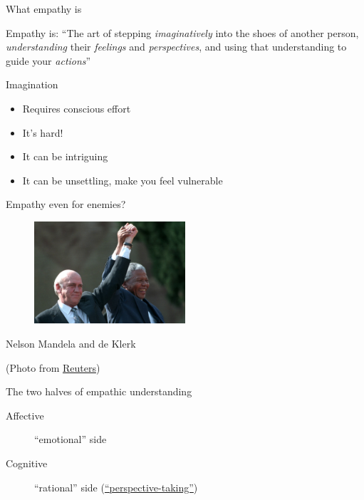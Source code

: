 \begin{frame}{What empathy is}
  \begin{block}{Empathy is:}
    ``The art of stepping \emph{imaginatively} into the shoes of
    another person, \emph{understanding} their \emph{feelings} and
    \emph{perspectives}, and using that understanding to guide your
    \emph{actions}''
  \end{block}
\end{frame}

\begin{frame}{Imagination}
  \begin{itemize}
  \item Requires conscious effort
  \item It's hard!
  \item It can be intriguing
  \item It can be unsettling, make you feel vulnerable
  \end{itemize}
\end{frame}

\begin{frame}{Empathy even for enemies?}
  \begin{figure}
    \includegraphics[width=0.5\textwidth]{deklerk-mandela1-1024x693.jpg}
  \end{figure}

  Nelson Mandela and de Klerk

  (Photo from \href{http://blogs.reuters.com/great-debate/2013/12/09/mandela-and-de-klerk-essential-partners/}{Reuters})
\end{frame}

\begin{frame}{The two halves of empathic understanding}
  \begin{description}
  \item[Affective] ``emotional'' side
  \item[Cognitive] ``rational'' side (\href{http://en.wikipedia.org/wiki/Perspective-Taking}{``perspective-taking''})
  \end{description}

\end{frame}


